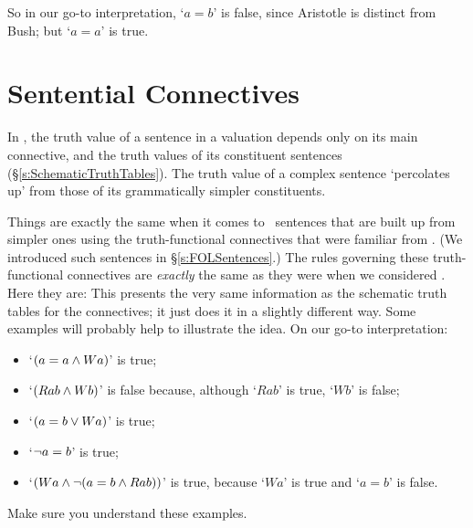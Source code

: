 \begin{earg}
\begin{itemize}
So in our go-to interpretation, `$a = b$' is false, since Aristotle is distinct from Bush; but `$a=a$' is true.
\end{itemize}


\section{Sentential Connectives}\label{fol.truth.sent}

 In \TFL, the truth value of a sentence in a valuation depends only on its main connective, and the truth values of its constituent sentences (§\ref{s:SchematicTruthTables}). The truth value of a complex sentence ‘percolates up’ from those of its grammatically simpler constituents.

Things are exactly the same when it comes to \FOL\ sentences that are built up from simpler ones using the truth-functional connectives that were familiar from \TFL. (We introduced such sentences in §\ref{s:FOLSentences}.) The rules governing these truth-functional connectives are \emph{exactly} the same as they were when we considered \TFL. Here they are:
This presents the very same information as the schematic truth tables for the connectives; it just does it in a slightly different way. Some examples will probably help to illustrate the idea. On our go-to interpretation:
	\begin{itemize}
		\item `$(a = a \wedge Wa)$' is true;
		\item `$(Rab \wedge Wb)$' is false because, although `$Rab$' is true, `$Wb$' is false;
		\item `$(a = b \vee Wa)$' is true;
		\item `$\neg a = b$' is true;
		\item `$(Wa \wedge \neg( a= b \wedge Rab))$' is true, because `$Wa$' is true and `$a = b$' is false.
	\end{itemize}
Make sure you understand these examples.


\end{earg}
